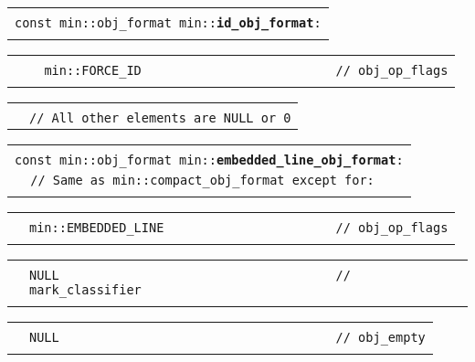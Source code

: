 \documentclass[12pt]{article}
\makeatletter
\newcommand{\TT}[1]{{\tt \bfseries #1}}
\newcommand{\ttindex}[1]{\index{#1@{\tt #1}}}
\newenvironment{indpar}[1][0.3in]%
	{\begin{list}{}%
		     {\setlength{\itemsep}{0in}%
		      \setlength{\topsep}{0in}%
		      \setlength{\parsep}{1ex}%
		      \setlength{\labelwidth}{#1}%
		      \setlength{\leftmargin}{#1}%
		      \addtolength{\leftmargin}{\labelsep}}%
	 \item}%
	{\end{list}}
\newcommand{\LABEL}[1]{\label{#1}}
\newlength{\ARGBREAKLENGTH}
\newcommand{\ARGBREAK}[1][\ARGBREAKLENGTH]{\\&\hspace*{#1}}
\newcommand{\MINKEY}[1]%
	   {\TT{#1}\ttindex{min::#1}\ttindex{#1}}
\makeatother
\begin{document}
\begin{indpar}[1em]

\begin{tabular}{r@{}l}\hspace*{0.1in} \\[-3ex]
\multicolumn{2}{l}{\tt const min::obj\_format
                   min::\MINKEY{id\_obj\_format}:}%
\LABEL{MIN::ID_OBJ_FORMAT}\ARGBREAK
\end{tabular}

\vspace{-4ex}\begin{tabular}{r@{}l}\hspace*{0.1in}\ARGBREAK
\verb|  min::FORCE_ID                          // obj_op_flags|\ARGBREAK
\end{tabular}

\vspace{-4ex}\begin{tabular}{r@{}l}\hspace*{0.1in}\ARGBREAK
\verb|// All other elements are NULL or 0|
\end{tabular}

\end{indpar}

\begin{indpar}[1em]

\begin{tabular}{r@{}l}\hspace*{0.1in} \\[-3ex]
\multicolumn{2}{l}{\tt const min::obj\_format
                   min::\MINKEY{embedded\_line\_obj\_format}:}%
\LABEL{MIN::EMBEDDED_LINE_OBJ_FORMAT}\ARGBREAK
\verb|// Same as min::compact_obj_format except for:|\ARGBREAK
\end{tabular}

\vspace{-4ex}\begin{tabular}{r@{}l}\hspace*{0.1in}\ARGBREAK
\verb|min::EMBEDDED_LINE                       // obj_op_flags|\ARGBREAK
\end{tabular}

\vspace{-4ex}\begin{tabular}{r@{}l}\hspace*{0.1in}\ARGBREAK
\verb|NULL                                     // mark_classifier|\ARGBREAK
\end{tabular}

\vspace{-4ex}\begin{tabular}{r@{}l}\hspace*{0.1in}\ARGBREAK
\verb|NULL                                     // obj_empty|\ARGBREAK
\end{tabular}

\end{indpar}
\end{document}
